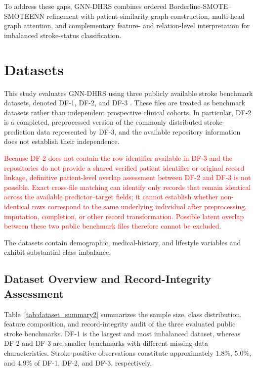 \documentclass[pdflatex,sn-mathphys-num]{sn-jnl}%
\theoremstyle{thmstyleone}%
\theoremstyle{thmstyletwo}%
\theoremstyle{thmstylethree}%
\begin{document}
To address these gaps, GNN-DHRS combines ordered
Borderline-SMOTE--SMOTEENN refinement with patient-similarity graph
construction, multi-head graph attention, and complementary feature- and
relation-level interpretation for imbalanced stroke-status classification.
\section{Datasets}
\label{sec:datasets}

This study evaluates GNN-DHRS using three publicly available stroke benchmark
datasets, denoted DF-1, DF-2, and DF-3
\cite{dataset_df1,dataset_df2,dataset_df3}.  {
These files are treated as benchmark datasets rather than independent
prospective clinical cohorts. In particular, DF-2 is a completed,
preprocessed version of the commonly distributed stroke-prediction data
represented by DF-3, and the available repository information does not
establish their independence.
}

\textcolor{red}{
Because DF-2 does not contain the row identifier available in DF-3 and the
repositories do not provide a shared verified patient identifier or original
record linkage, definitive patient-level overlap assessment between DF-2 and
DF-3 is not possible. Exact cross-file matching can identify only records that
remain identical across the available predictor--target fields; it cannot
establish whether non-identical rows correspond to the same underlying
individual after preprocessing, imputation, completion, or other record
transformation. Possible latent overlap between these two public benchmark
files therefore cannot be excluded.
}

The datasets contain demographic, medical-history, and lifestyle variables
and exhibit substantial class imbalance.
\subsection{Dataset Overview and Record-Integrity Assessment}
\label{subsec:dataset_overview}

Table~\ref{tab:dataset_summary2} summarizes the sample size, class
distribution, feature composition, and record-integrity audit of the three
evaluated public stroke benchmarks. DF-1 is the largest and most imbalanced
dataset, whereas DF-2 and DF-3 are smaller benchmarks with different
missing-data characteristics. Stroke-positive observations constitute
approximately \(1.8\%\), \(5.0\%\), and \(4.9\%\) of DF-1, DF-2, and DF-3,
respectively.
\end{document}
